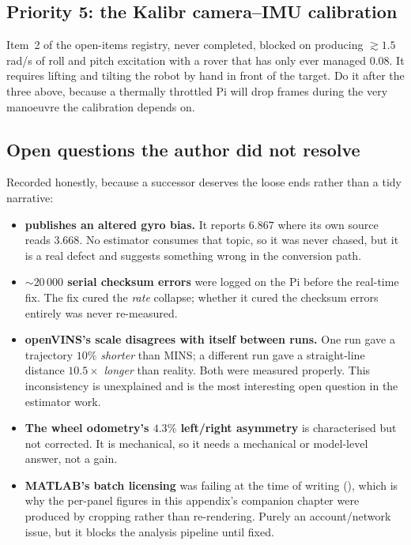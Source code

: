 \subsection{Priority 5: the Kalibr camera--IMU calibration}
Item~2 of the open-items registry, never completed, blocked on producing
$\gtrsim1.5$\,rad/s of roll and pitch excitation with a rover that has only ever
managed $0.08$. It requires lifting and tilting the robot by hand in front of
the target. Do it after the three above, because a thermally throttled Pi will
drop frames during the very manoeuvre the calibration depends on.

\subsection{Open questions the author did not resolve}
Recorded honestly, because a successor deserves the loose ends rather than a
tidy narrative:

\begin{itemize}[leftmargin=1.4em]
\item \textbf{ publishes an altered gyro
  bias.} It reports $6.867$ where its own source reads $3.668$. No estimator
  consumes that topic, so it was never chased, but it is a real defect and
  suggests something wrong in the conversion path.
\item \textbf{$\sim20\,000$ serial checksum errors} were logged on the Pi
  before the real-time fix. The fix cured the \emph{rate} collapse; whether it
  cured the checksum errors entirely was never re-measured.
\item \textbf{openVINS's scale disagrees with itself between runs.} One run gave
  a trajectory $10\%$ \emph{shorter} than MINS; a different run gave a
  straight-line distance $10.5\times$ \emph{longer} than reality. Both were
  measured properly. This inconsistency is unexplained and is the most
  interesting open question in the estimator work.
\item \textbf{The wheel odometry's $4.3\%$ left/right asymmetry} is
  characterised but not corrected. It is mechanical, so it needs a mechanical
  or model-level answer, not a gain.
\item \textbf{MATLAB's batch licensing} was failing at the time of writing
  (), which is why the per-panel figures in this appendix's
  companion chapter were produced by cropping rather than re-rendering. Purely
  an account/network issue, but it blocks the analysis pipeline until fixed.
\end{itemize}


